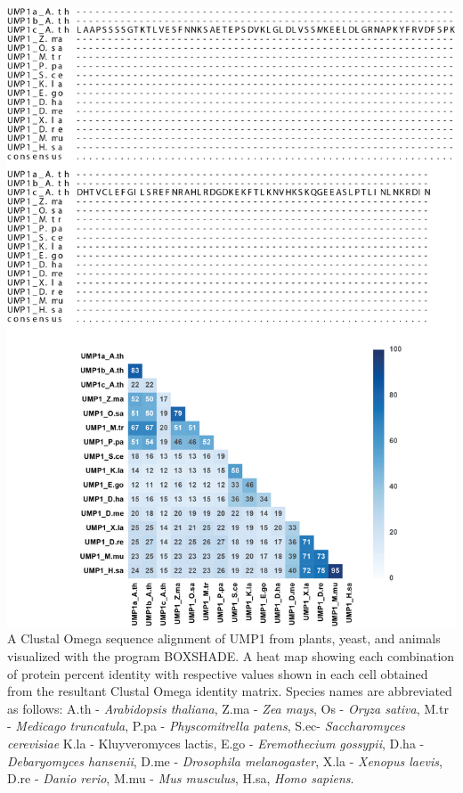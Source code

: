 \begin{FPfigure}
	\ContinuedFloat
	\centering
	\includegraphics[width=\columnwidth]{Proteasome/ump1align2.png}
	{A Clustal Omega \citep{sievers14} sequence alignment of UMP1 from plants, yeast, and animals visualized with the program BOXSHADE. A heat map showing each combination of protein percent identity with respective values shown in each cell obtained from the resultant Clustal Omega identity matrix. Species names are abbreviated as follows: A.th - \textit{Arabidopsis thaliana}, Z.ma - \textit{Zea mays}, Os - \textit{Oryza sativa}, M.tr - \textit{Medicago truncatula}, P.pa - \textit{Physcomitrella patens}, S.ec- \textit{Saccharomyces cerevisiae} K.la - {Kluyveromyces lactis}, E.go - \textit{Eremothecium gossypii}, D.ha - \textit{Debaryomyces hansenii}, D.me - \textit{Drosophila melanogaster}, X.la - \textit{Xenopus laevis}, D.re - \textit{Danio rerio}, M.mu - \textit{Mus musculus}, H.sa, \textit{Homo sapiens}.}
	\label{fig:ump1align2}
\end{FPfigure}
